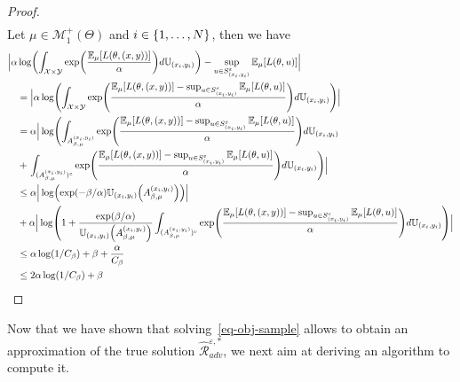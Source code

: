 \begin{proof}
\begin{align*}
\end{align*}
Let $\mu\in\mathcal{M}_1^{+}(\Theta)$ and $i\in\{1,\dots,N\}$, then we have
\begin{align*}
 \Big|\alpha&\log\left(\int_{\mathcal{X}\times\mathcal{Y}}\exp\left(\frac{\mathbb{E}_{\mu}[\loss(\theta,(x,y))]}{\alpha} \right) d\mathbb{U}_{(x_i,y_i)}\right)-\sup_{u\in S^{\varepsilon}_{(x_i,y_i)}}\mathbb{E}_{\mu}[\loss(\theta,u)] \Big|\\
 &=\Big|\alpha\log\left(\int_{\mathcal{X}\times\mathcal{Y}}\exp\left(\frac{\mathbb{E}_{\mu}[\loss(\theta,(x,y))]-\sup_{u\in S^{\varepsilon}_{(x_i,y_i)}}\mathbb{E}_{\mu}[\loss(\theta,u)]}{\alpha} \right) d\mathbb{U}_{(x_i,y_i)}\right) \Big|  \\
 &=\alpha  \Big| \log\left(\int_{A_{\beta,\mu}^{(x_i,y_i)}}\exp\left(\frac{\mathbb{E}_{\mu}[\loss(\theta,(x,y))]-\sup_{u\in S^{\varepsilon}_{(x_i,y_i)}}\mathbb{E}_{\mu}[\loss(\theta,u)]}{\alpha} \right) d\mathbb{U}_{(x_i,y_i)}\right. \\
 &+ \left.\int_{(A_{\beta,\mu}^{(x_i,y_i)})^{c}}\exp\left(\frac{\mathbb{E}_{\mu}[\loss(\theta,(x,y))]-\sup_{u\in S^{\varepsilon}_{(x_i,y_i)}}\mathbb{E}_{\mu}[\loss(\theta,u)]}{\alpha} \right) d\mathbb{U}_{(x_i,y_i)}\right)  \Big|\\
 &\leq \alpha \Big | \log\left(\exp(-\beta/\alpha)\mathbb{U}_{(x_i,y_i)}\left(A_{\beta,\mu}^{(x_i,y_i)}\right) \right)\Big | \\
 &+ \alpha  \Big|\log\left(1+ \frac{\exp(\beta/\alpha)}{\mathbb{U}_{(x_i,y_i)}\left(A_{\beta,\mu}^{(x_i,y_i)}\right)}\int_{(A_{\beta,\mu}^{(x_i,y_i)})^{c}}\exp\left(\frac{\mathbb{E}_{\mu}[\loss(\theta,(x,y))]-\sup_{u\in S^{\varepsilon}_{(x_i,y_i)}}\mathbb{E}_{\mu}[\loss(\theta,u)]}{\alpha} \right) d\mathbb{U}_{(x_i,y_i)}\right)  \Big|\\
 &\leq \alpha\log(1/C_\beta)+\beta +\frac{\alpha}{C_\beta}\\
 &\leq 2\alpha\log(1/C_\beta)+\beta
\end{align*}
\end{proof}



Now that we have shown that solving~\eqref{eq-obj-sample} allows to obtain an approximation of the true solution $\widehat{\mathcal{R}}_{adv}^{\varepsilon,*}$, we next aim at deriving an algorithm to compute it. 

